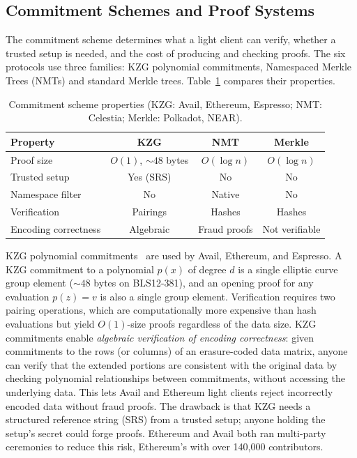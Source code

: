 \subsection{Commitment Schemes and Proof Systems}
\label{subsec:commitments}

The commitment scheme determines what a light client can verify, whether a trusted setup is needed, and the cost of producing and checking proofs.
The six protocols use three families: KZG polynomial commitments, Namespaced Merkle Trees (NMTs) and standard Merkle trees.
Table~\ref{tab:commitment_comparison} compares their properties.

\begin{table}[t]
\centering
\caption{Commitment scheme properties (KZG: Avail, Ethereum, Espresso; NMT: Celestia; Merkle: Polkadot, NEAR).}
\label{tab:commitment_comparison}
\setlength{\tabcolsep}{2pt}
\footnotesize
\begin{tabular}{l c c c}
\toprule
\textbf{Property} & \textbf{KZG} & \textbf{NMT} & \textbf{Merkle} \\
\midrule
Proof size & $O(1)$, ${\sim}48$ bytes & $O(\log n)$ & $O(\log n)$ \\
Trusted setup & Yes (SRS) & No & No \\
Namespace filter & No & Native & No \\
Verification & Pairings & Hashes & Hashes \\
Encoding correctness & Algebraic & Fraud proofs & Not verifiable \\
\bottomrule
\end{tabular}
\end{table}

KZG polynomial commitments~\cite{KZG_Original} are used by Avail, Ethereum, and Espresso.
A KZG commitment to a polynomial $p(x)$ of degree $d$ is a single elliptic curve group element (${\sim}48$ bytes on BLS12-381), and an opening proof for any evaluation $p(z) = v$ is also a single group element.
Verification requires two pairing operations, which are computationally more expensive than hash evaluations but yield $O(1)$-size proofs regardless of the data size.
KZG commitments enable \emph{algebraic verification of encoding correctness}: given commitments to the rows (or columns) of an erasure-coded data matrix, anyone can verify that the extended portions are consistent with the original data by checking polynomial relationships between commitments, without accessing the underlying data.
This lets Avail and Ethereum light clients reject incorrectly encoded data without fraud proofs.
The drawback is that KZG needs a structured reference string (SRS) from a trusted setup; anyone holding the setup's secret could forge proofs.
Ethereum and Avail both ran multi-party ceremonies to reduce this risk, Ethereum's with over 140{,}000 contributors.

